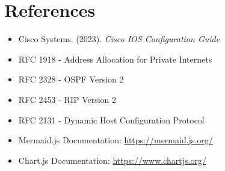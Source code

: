 \documentclass[12pt,a4paper]{report}
\begin{document}
\chapter{References}

\begin{itemize}
    \item Cisco Systems. (2023). \textit{Cisco IOS Configuration Guide}
    \item RFC 1918 - Address Allocation for Private Internets
    \item RFC 2328 - OSPF Version 2
    \item RFC 2453 - RIP Version 2
    \item RFC 2131 - Dynamic Host Configuration Protocol
    \item Mermaid.js Documentation: \url{https://mermaid.js.org/}
    \item Chart.js Documentation: \url{https://www.chartjs.org/}
\end{itemize}
\end{document}
